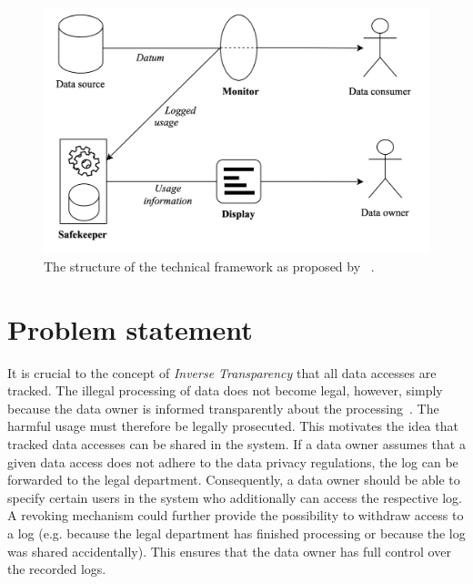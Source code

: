 \documentclass[../main.tex]{subfiles}
\begin{document}
\begin{figure}[ht]
    \includegraphics[scale=0.16]{../img/01/toolchain.png}
    \centering
    \caption[Existing toolchain]{The structure of the technical framework as proposed by \citeauthor{Zieglmeier2021}~\cite{Zieglmeier2021}.}
    \label{fig:toolchain}
\end{figure}

\section{Problem statement}

It is crucial to the concept of \emph{Inverse Transparency} that all data accesses are tracked.
The illegal processing of data does not become legal, however, simply because the data owner is informed transparently about the processing~\cite{Boes2022}.
The harmful usage must therefore be legally prosecuted.
This motivates the idea that tracked data accesses can be shared in the system.
If a data owner assumes that a given data access does not adhere to the data privacy regulations, the log can be forwarded to the legal department.
Consequently, a data owner should be able to specify certain users in the system who additionally can access the respective log.
A revoking mechanism could further provide the possibility to withdraw access to a log (e.g. because the legal department has finished processing or because the log was shared accidentally).
This ensures that the data owner has full control over the recorded logs.
\end{document}
